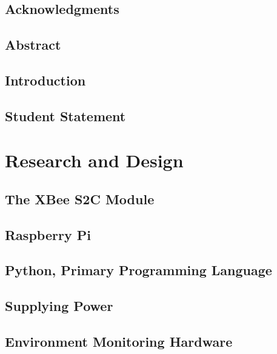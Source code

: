 \documentclass[letter,twocolumn]{report}
\date{February 15, 2020}
\author{Nathan Louck}
\begin{document}
	\large
	\begin{titlepage}
		
	
	\newpage
		\section{Acknowledgments}
		
	\end{titlepage}
		
	\subsection{Abstract}
		
	\subsection{Introduction}
		

	
	
	\subsection{Student Statement}
		

	\tableofcontents
	\listoffigures

	\section{Research and Design}
		\subsection{The XBee S2C Module}
			
		\subsection{Raspberry Pi}
			
		\subsection{Python, Primary Programming Language}
			
		\subsection{Supplying Power}
			
	
	\subsection{Environment Monitoring Hardware}
		
	
\end{document}
